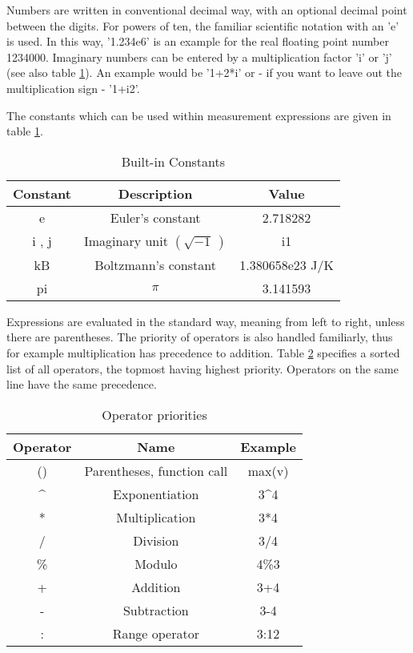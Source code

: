 
Numbers are written in conventional decimal way, with an optional
decimal point between the digits. For powers of ten, the familiar
scientific notation with an 'e' is used. In this way, '1.234e6' is an
example for the real floating point number 1234000. Imaginary numbers
can be entered by a multiplication factor 'i' or 'j' (see also table
\ref{table:constants}).  An example would be '1+2{*}i' or - if you
want to leave out the multiplication sign - '1+i2'.



The constants which can be used within measurement expressions are
given in table \ref{table:constants}.

%
\begin{table}[ht]
\begin{center}\begin{tabular}{|c|c|c|}
\hline 
Constant&
Description&
Value\tabularnewline
\hline
\hline 
e&
Euler's constant&
2.718282\tabularnewline
\hline 
i , j&
Imaginary unit $\left(\sqrt{-1}\,\right)$&
i1\tabularnewline
\hline 
kB&
Boltzmann's constant&
1.380658e23 J/K\tabularnewline
\hline 
pi&
$\pi$&
3.141593\tabularnewline
\hline
\end{tabular}\end{center}


\caption{\label{table:constants}Built-in Constants}
\end{table}






Expressions are evaluated in the standard way, meaning from left to
right, unless there are parentheses. The priority of operators is
also handled familiarly, thus for example multiplication has precedence
to addition. Table \ref{table:operators} specifies a sorted list
of all operators, the topmost having highest priority. Operators on
the same line have the same precedence.

%
\begin{table}[ht]
\begin{center}\begin{tabular}{|c|c|c|}
\hline 
Operator&
Name&
Example\tabularnewline
\hline
\hline 
()&
Parentheses, function call&
max(v)\tabularnewline
\hline 
\textasciicircum{}&
Exponentiation&
3\textasciicircum{}4\tabularnewline
\hline 
{*}&
Multiplication&
3{*}4\tabularnewline
/&
Division&
3/4\tabularnewline
\%&
Modulo&
4\%3\tabularnewline
\hline 
+&
Addition&
3+4\tabularnewline
-&
Subtraction&
3-4\tabularnewline
\hline 
:&
Range operator&
3:12\tabularnewline
\hline
\end{tabular}\end{center}


\caption{\label{table:operators}Operator priorities}
\end{table}



